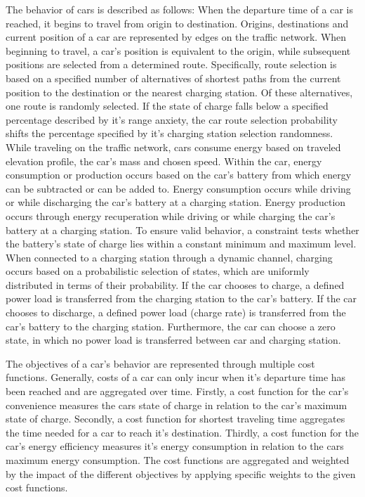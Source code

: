 The behavior of cars is described as follows: When the departure time of a car is reached, it begins to travel from origin to destination. Origins, destinations and current position of a car are represented by edges on the traffic network.  When beginning to travel, a car's position is equivalent to the origin, while subsequent positions are selected from a determined route. Specifically, route selection is based on a specified number of alternatives of shortest paths from the current position to the destination or the nearest charging station. Of these alternatives, one route is randomly selected. If the state of charge falls below a specified percentage described by it's range anxiety, the car route selection probability shifts the percentage specified by it's charging station selection randomness. While traveling on the traffic network, cars consume energy based on traveled elevation profile, the car's mass and chosen speed. Within the car, energy consumption or production occurs based on the car's battery from which energy can be subtracted or can be added to. Energy consumption occurs while driving or while discharging the car's battery at a charging station. Energy production occurs through energy recuperation while driving or while charging the car's battery at a charging station. To ensure valid behavior, a constraint tests whether the battery's state of charge lies within a constant minimum and maximum level. When connected to a charging station through a dynamic channel, charging occurs based on a probabilistic selection of states, which are uniformly distributed in terms of their probability. If the car chooses to charge, a defined power load is transferred from the charging station to the car's battery. If the car chooses to discharge, a defined power load (charge rate) is transferred from the car's battery to the charging station. Furthermore, the car can choose a zero state, in which no power load is transferred between car and charging station.

The objectives of a car's behavior are represented through multiple cost functions. Generally, costs of a car can only incur when it's departure time has been reached and are aggregated over time. %
Firstly, a cost function for the car's convenience measures the cars state of charge in relation to the car's maximum state of charge. Secondly, a cost function for shortest traveling time aggregates the time needed for a car to reach it's destination. Thirdly, a cost function for the car's energy efficiency measures it's energy consumption in relation to the cars maximum energy consumption. The cost functions are aggregated and weighted by the impact of the different objectives by applying specific weights to the given cost functions.


